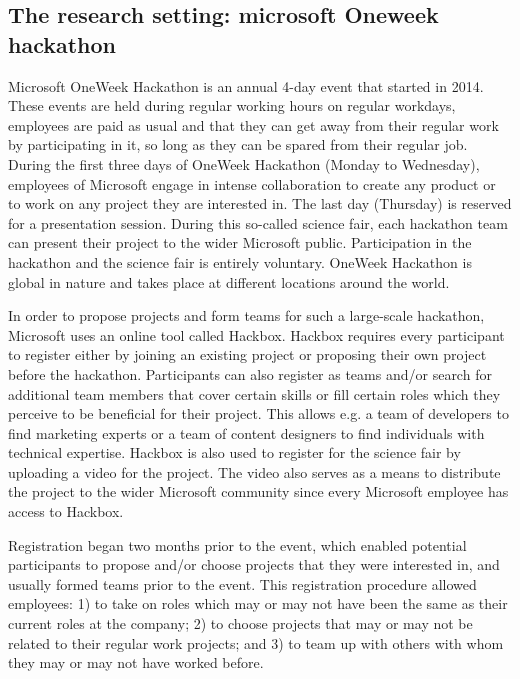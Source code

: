 \documentclass{hcij}
\begin{document}
\subsection{The research setting: microsoft Oneweek hackathon}
Microsoft OneWeek Hackathon is an annual 4-day event that started in 2014. These events are held during regular working hours on regular workdays, employees are paid as usual and that they can get away from their regular work by participating in it, so long as they can be spared from their regular job. During the first three days of OneWeek Hackathon (Monday to Wednesday), employees of Microsoft engage in intense collaboration to create any product or to work on any project they are interested in. The last day (Thursday) is reserved for a presentation session. During this so-called science fair, each hackathon team can present their project to the wider Microsoft public. Participation in the hackathon and the science fair is entirely voluntary. OneWeek Hackathon is global in nature and takes place at different locations around the world.

In order to propose projects and form teams for such a large-scale hackathon, Microsoft uses an online tool called Hackbox. Hackbox requires every participant to register either by joining an existing project or proposing their own project before the hackathon. Participants can also register as teams and/or search for additional team members that cover certain skills or fill certain roles which they perceive to be beneficial for their project. This allows e.g. a team of developers to find marketing experts or a team of content designers to find individuals with technical expertise. Hackbox is also used to register for the science fair by uploading a video for the project. The video also serves as a means to distribute the project to the wider Microsoft community since every Microsoft employee has access to Hackbox.

Registration began two months prior to the event, which enabled potential participants to propose and/or choose projects that they were interested in, and usually formed teams prior to the event. This registration procedure allowed employees: 1) to take on roles which may or may not have been the same as their current roles at the company; 2) to choose projects that may or may not be related to their regular work projects; and 3) to team up with others with whom they may or may not have worked before.
\end{document}
